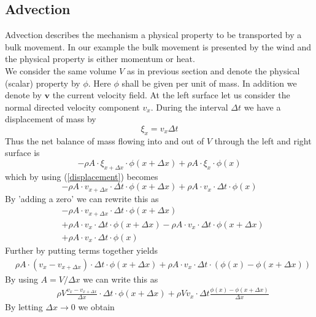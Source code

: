 \documentclass[]{article}
\begin{document}
\subsection{Advection}
Advection describes the mechanism a physical property to be transported by a bulk movement. In our example the bulk movement is presented by the wind and the physical property is either momentum or heat.\\
We consider the same volume $V$ as in previous section and denote the physical (scalar) property by $\phi$. Here $\phi$ shall be given per unit of mass. In addition we denote by $\textbf{v}$ the current velocity field. At the left surface let us consider the normal directed velocity component $v_x$. During the interval $\Delta t$ we have a displacement of mass by
\begin{equation} \label{displacement}
\xi_{x}=v_x\Delta t
\end{equation} 
Thus the net balance of mass flowing into and out of $V$ through the left and right surface is
\begin{equation} \label{net_flow}
-\rho A\cdot\xi_{x+\Delta x} \cdot \phi(x+\Delta x)+\rho A\cdot\xi_{x} \cdot \phi(x)
\end{equation}
which by using (\ref{displacement}) becomes
\begin{equation*}
-\rho A\cdot  v_{x+\Delta x}\cdot\Delta t \cdot \phi(x+\Delta x)+\rho A\cdot  v_{x}\cdot\Delta t \cdot \phi(x)
\end{equation*}
By 'adding a zero' we can rewrite this as
\begin{align*}
&-\rho A\cdot v_{x+\Delta x}\cdot\Delta t \cdot \phi(x+\Delta x) \\ &+
\rho A\cdot v_{x}\cdot\Delta t \cdot \phi(x+\Delta x) -
\rho A\cdot v_{x}\cdot\Delta t \cdot \phi(x+\Delta x) \\ &+
\rho A\cdot v_{x}\cdot\Delta t \cdot \phi(x)
\end{align*}
Further by putting terms together yields
\begin{align*}
&\rho A\cdot (v_{x}-v_{x+\Delta x})\cdot\Delta t \cdot \phi(x+\Delta x) +
\rho A\cdot v_{x}\cdot\Delta t \cdot (\phi(x)-\phi(x+\Delta x))
\end{align*}
By using $A=V/\Delta x$ we can write this as
\begin{align*}
&\rho V \frac{v_{x}-v_{x+\Delta x}}{\Delta x}\cdot\Delta t \cdot \phi(x+\Delta x) +
\rho V v_{x}\cdot\Delta t\frac{\phi(x)-\phi(x+\Delta x)}{\Delta x}
\end{align*}
By letting $\Delta x\rightarrow 0$ we obtain
\end{document}
